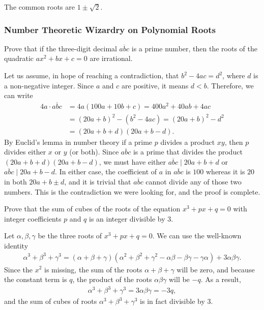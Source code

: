 \begin{solution}
    The common roots are $1 \pm \sqrt{2}$.
\end{solution}

\subsubsection{Number Theoretic Wizardry on Polynomial Roots}

\begin{question}
    Prove that if the three-digit decimal $\overline{abc}$ is a prime number, then the roots of the quadratic $ax^2+bx+c=0$ are irrational.
\end{question}

\begin{solution}
    Let us assume, in hope of reaching a contradiction, that $b^2-4ac=d^2$, where $d$ is a non-negative integer. Since $a$ and $c$ are positive, it means $d<b$. Therefore, we can write
    \begin{align*}
        4a \cdot \overline{abc} &= 4a(100a+10b+c)=400a^2+40ab+4ac\\
        &= (20a+b)^2 - (b^2-4ac) = (20a+b)^2 - d^2\\
        &= (20a+b+d)(20a+b-d).
    \end{align*}
    By Euclid's lemma in number theory if a prime $p$ divides a product $xy$, then $p$ divides either $x$ or $y$ (or both). Since $\overline{abc}$ is a prime that divides the product $(20a+b+d)(20a+b-d)$, we must have either $\overline{abc} \mid 20a+b+d$ or $\overline{abc} \mid 20a+b-d$. In either case, the coefficient of $a$ in $\overline{abc}$ is $100$ whereas it is $20$ in both $20a+b\pm d$, and it is trivial that $\overline{abc}$ cannot divide any of those two numbers. This is the contradiction we were looking for, and the proof is complete.
\end{solution}

\begin{question}
    Prove that the sum of cubes of the roots of the equation $x^3+px+q=0$ with integer coefficients $p$ and $q$ is an integer divisible by $3$.
\end{question}

\begin{solution}
    Let $\alpha,\beta,\gamma$ be the three roots of $x^3+px+q=0$. We can use the well-known identity
    \begin{align*}
        \alpha^3+\beta^3+\gamma^3 = (\alpha+\beta+\gamma)(\alpha^2+\beta^2+\gamma^2-\alpha\beta-\beta\gamma-\gamma\alpha)+3\alpha\beta\gamma.
    \end{align*}
    Since the $x^2$ is missing, the sum of the roots $\alpha+\beta+\gamma$ will be zero, and because the constant term is $q$, the product of the roots $\alpha\beta\gamma$ will be $-q$. As a result,
    \begin{align*}
        \alpha^3+\beta^3+\gamma^3 = 3\alpha\beta\gamma=-3q,
    \end{align*}
    and the sum of cubes of roots $\alpha^3+\beta^3+\gamma^3$ is in fact divisible by $3$.
\end{solution}

